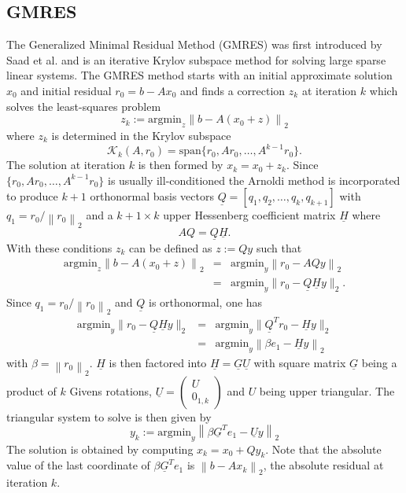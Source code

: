 \documentclass{scrartcl}
\numberwithin{equation}{section}
\newcommand{\norm}[1]{\left\lVert#1\right\rVert}
\begin{document}
\subsection{GMRES}
The Generalized Minimal Residual Method (GMRES) was first introduced by Saad et al. \cite{Saad:1986:GGM:14063.14074} and is an iterative Krylov subspace method for solving large sparse linear systems. 
The GMRES method starts with an initial approximate solution $x_0$ and initial residual $r_0 = b - Ax_0$ and finds a correction $z_k$ at iteration $k$ which solves the least-squares problem 
\begin{equation}
	z_k := \text{argmin}_{z} \norm{b - A(x_0 + z)}_2
\end{equation}
where $z_k$ is determined in the Krylov subspace 
\begin{equation*}
	 \mathcal{K}_k(A, r_0) = \text{span}\{r_0, Ar_0, \ldots, A^{k-1}r_0\}.
\end{equation*}
The solution at iteration $k$ is then formed by $x_k = x_0 + z_k$.
Since $\{r_0, Ar_0, \ldots, A^{k-1}r_0\}$ is usually ill-conditioned the Arnoldi method is incorporated to produce $k + 1$ orthonormal basis vectors $\underline{Q} = [q_1, q_2, \ldots, q_k, q_{k + 1}]$ with $q_1 = r_0/\norm{r_0}_2$ and a $k + 1 \times k$ upper Hessenberg coefficient matrix $\underline{H}$ where
\begin{equation*}
	AQ = \underline{Q}\underline{H}.
\end{equation*}
With these conditions $z_k$ can be defined as $z := Qy$ such that 
\begin{eqnarray*}
	\text{argmin}_{z} \norm{b - A(x_0 + z)}_2 &=& \text{argmin}_y \norm{r_0 - AQy}_2 \\
	 &=& \text{argmin}_{y} \lVert r_0 - \underline{Q} \underline{H} y \rVert_2.
\end{eqnarray*}
Since $q_1 = r_0/\norm{r_0}_2$ and $\underline{Q}$ is orthonormal, one has
\begin{eqnarray} \label{eq:stdgmreslsp}
	\text{argmin}_y \lVert r_0 - \underline{Q} \underline{H} y \rVert_2 &=& \text{argmin}_{y} \lVert \underline{Q}^T r_0 - \underline{H} y \rVert_2 \nonumber \\
	&=& \text{argmin}_{y} \norm{\beta e_1 - \underline{H} y}_2 
\end{eqnarray}
with $\beta = \norm{r_0}_2$.
$\underline{H}$ is then factored into $\underline{H} = \underline{G}\underline{U}$ with square matrix $\underline{G}$ being a product of $k$ Givens rotations, $\underline{U} = 
\begin{pmatrix}
	U \\
	0_{1, k}
\end{pmatrix}$
and $U$ being upper triangular. The triangular system to solve is then given by
\begin{equation*}
	y_k := \text{argmin}_y \norm{\beta \underline{G}^T e_1 - \underline{U} y}_2
\end{equation*}
The solution is obtained by computing $x_k = x_0 + Qy_k$. Note that the absolute value of the last coordinate of $\beta \underline{G}^T e_1$ is $\norm{b - Ax_k}_2$, the absolute residual at iteration $k$.
\end{document}
